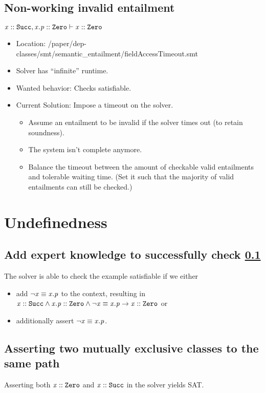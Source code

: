 \documentclass[a4paper]{article}
\begin{document}
\subsection{Non-working invalid entailment}
\label{example:field-access-timeout}
$\mathit{x} :: \mathit{\mathtt{Succ}}, \mathit{x.p} :: \mathit{\mathtt{Zero}} \vdash \mathit{x} :: \mathit{\mathtt{Zero}}$
\begin{itemize}
  \item Location: /paper/dep-classes/smt/semantic_entailment/fieldAccessTimeout.smt
  \item Solver has ``infinite'' runtime.
  \item Wanted behavior: Checks satisfiable.
  \item Current Solution: Impose a timeout on the solver.
  \begin{itemize}
    \item Assume an entailment to be invalid if the solver times out (to retain soundness).
    \item The system isn't complete anymore.
    \item Balance the timeout between the amount of checkable valid entailments and tolerable waiting time.
    (Set it such that the majority of valid entailments can still be checked.)
  \end{itemize}
\end{itemize}

\section{Undefinedness}
\subsection{Add expert knowledge to successfully check \ref{example:field-access-timeout}}
The solver is able to check the example satisfiable if we either
\begin{itemize}
  \item add $\neg \mathit{x} \equiv \mathit{x.p}$ to the context, resulting in ${\mathit{x} :: \mathit{\mathtt{Succ}} \land \mathit{x.p} :: \mathit{\mathtt{Zero}} \land \neg \mathit{x} \equiv \mathit{x.p}} \rightarrow {\ensuremath{\mathit{x} :: \mathit{\mathtt{Zero}}}}$ or
  \item additionally assert $\neg \mathit{x} \equiv \mathit{x.p}$.
\end{itemize}

\subsection{Asserting two mutually exclusive classes to the same path}
\label{section:mutually-exclusive-classes}
Asserting both $\mathit{x} :: \mathit{\mathtt{Zero}}$ and $\mathit{x} :: \mathit{\mathtt{Succ}}$ in the solver yields SAT.
\end{document}
